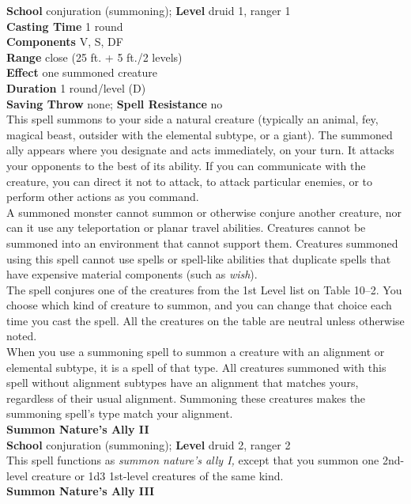 \textbf{School} conjuration (summoning); \textbf{Level} druid 1, ranger 1\\
\textbf{Casting Time} 1 round\\
\textbf{Components} V, S, DF\\
\textbf{Range} close (25 ft. + 5 ft./2 levels)\\
\textbf{Effect} one summoned creature\\
\textbf{Duration} 1 round/level (D)\\
\textbf{Saving Throw} none; \textbf{Spell Resistance} no\\
This spell summons to your side a natural creature (typically an animal, fey, magical beast, outsider with the elemental subtype, or a giant). The summoned ally appears where you designate and acts immediately, on your turn. It attacks your opponents to the best of its ability. If you can communicate with the creature, you can direct it not to attack, to attack particular enemies, or to perform other actions as you command.\\
A summoned monster cannot summon or otherwise conjure another creature, nor can it use any teleportation or planar travel abilities. Creatures cannot be summoned into an environment that cannot support them. Creatures summoned using this spell cannot use spells or spell-like abilities that duplicate spells that have expensive material components (such as \textit{wish}).\\
The spell conjures one of the creatures from the 1st Level list on Table 10--2. You choose which kind of creature to summon, and you can change that choice each time you cast the spell. All the creatures on the table are neutral unless otherwise noted.\\
When you use a summoning spell to summon a creature with an alignment or elemental subtype, it is a spell of that type. All creatures summoned with this spell without alignment subtypes have an alignment that matches yours, regardless of their usual alignment. Summoning these creatures makes the summoning spell's type match your alignment. \\
\textbf{Summon Nature's Ally II}\\
\textbf{School} conjuration (summoning); \textbf{Level} druid 2, ranger 2\\
This spell functions as \textit{summon nature's ally I, }except that you summon one 2nd-level creature or 1d3 1st-level creatures of the same kind.\\
\textbf{Summon Nature's Ally III}\\
